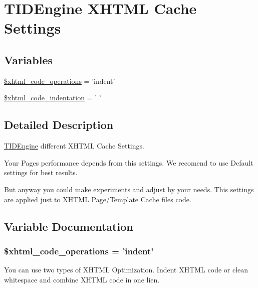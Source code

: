 \hypertarget{group__xhtml__cache__settings}{
\section{TIDEngine XHTML Cache Settings}
\label{group__xhtml__cache__settings}
}
\subsection*{Variables}
\begin{DoxyCompactItemize}
\item 
\hyperlink{group__xhtml__cache__settings_ga0216b64e0f4557ed5a36e5aaeccd2745}{\$xhtml\_\-code\_\-operations} = 'indent'
\item 
\hyperlink{group__xhtml__cache__settings_ga2395c8c084b383c7fa248df50b624e9a}{\$xhtml\_\-code\_\-indentation} = ' '
\end{DoxyCompactItemize}


\subsection{Detailed Description}
\hyperlink{class_t_i_d_engine}{TIDEngine} different XHTML Cache Settings.

Your Pages performance depends from this settings. We recomend to use Default settings for best results.\par
\par
 But anyway you could make experiments and adjust by your needs. This settings are applied just to XHTML Page/Template Cache files code. 

\subsection{Variable Documentation}
\hypertarget{group__xhtml__cache__settings_ga0216b64e0f4557ed5a36e5aaeccd2745}{
\subsubsection[{\$xhtml\_\-code\_\-operations}]{\setlength{\rightskip}{0pt plus 5cm}\$xhtml\_\-code\_\-operations = 'indent'}}
\label{group__xhtml__cache__settings_ga0216b64e0f4557ed5a36e5aaeccd2745}
You can use two types of XHTML Optimization. Indent XHTML code or clean whitespace and combine XHTML code in one lien.


